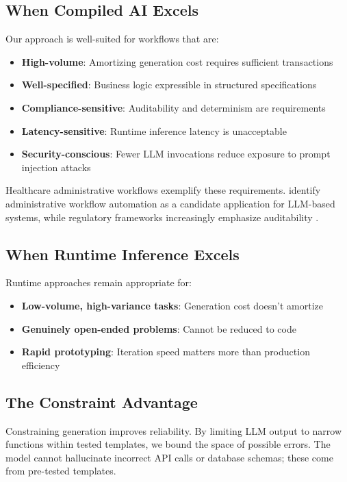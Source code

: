 \documentclass[11pt]{article}
\begin{document}
\subsection{When Compiled AI Excels}

Our approach is well-suited for workflows that are:
\begin{itemize}
    \item \textbf{High-volume}: Amortizing generation cost requires sufficient transactions
    \item \textbf{Well-specified}: Business logic expressible in structured specifications
    \item \textbf{Compliance-sensitive}: Auditability and determinism are requirements
    \item \textbf{Latency-sensitive}: Runtime inference latency is unacceptable
    \item \textbf{Security-conscious}: Fewer LLM invocations reduce exposure to prompt injection attacks
\end{itemize}

Healthcare administrative workflows exemplify these requirements. \citet{qiu2024healthcare} identify administrative workflow automation as a candidate application for LLM-based systems, while regulatory frameworks increasingly emphasize auditability \citep{fda2025}.

\subsection{When Runtime Inference Excels}

Runtime approaches remain appropriate for:
\begin{itemize}
    \item \textbf{Low-volume, high-variance tasks}: Generation cost doesn't amortize
    \item \textbf{Genuinely open-ended problems}: Cannot be reduced to code
    \item \textbf{Rapid prototyping}: Iteration speed matters more than production efficiency
\end{itemize}

\subsection{The Constraint Advantage}

Constraining generation improves reliability. By limiting LLM output to narrow functions within tested templates, we bound the space of possible errors. The model cannot hallucinate incorrect API calls or database schemas; these come from pre-tested templates.
\end{document}
